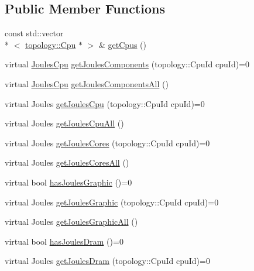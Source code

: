 \subsection*{Public Member Functions}
\begin{DoxyCompactItemize}
\item 
const std\-::vector\\*
$<$ \hyperlink{classmammut_1_1topology_1_1Cpu}{topology\-::\-Cpu} $\ast$ $>$ \& \hyperlink{classmammut_1_1energy_1_1CounterCpus_a25dbf6940e615a3662cbe10292ad7eaa}{get\-Cpus} ()
\item 
virtual \hyperlink{classmammut_1_1energy_1_1JoulesCpu}{Joules\-Cpu} \hyperlink{classmammut_1_1energy_1_1CounterCpus_a4324fc4985dc89228450436db46551b7}{get\-Joules\-Components} (topology\-::\-Cpu\-Id cpu\-Id)=0
\item 
virtual \hyperlink{classmammut_1_1energy_1_1JoulesCpu}{Joules\-Cpu} \hyperlink{classmammut_1_1energy_1_1CounterCpus_ad6a20ef6baa36b01f55b2065e01ec3f8}{get\-Joules\-Components\-All} ()
\item 
virtual Joules \hyperlink{classmammut_1_1energy_1_1CounterCpus_a80c1f90abccce3f3ab621f08f7141f78}{get\-Joules\-Cpu} (topology\-::\-Cpu\-Id cpu\-Id)=0
\item 
virtual Joules \hyperlink{classmammut_1_1energy_1_1CounterCpus_aa50b03617eafb90d64460941a8641a28}{get\-Joules\-Cpu\-All} ()
\item 
virtual Joules \hyperlink{classmammut_1_1energy_1_1CounterCpus_a2c041bbe181f593a50490a53a2729989}{get\-Joules\-Cores} (topology\-::\-Cpu\-Id cpu\-Id)=0
\item 
virtual Joules \hyperlink{classmammut_1_1energy_1_1CounterCpus_a615edc6a1ece84d27ca1a508ec1a72d8}{get\-Joules\-Cores\-All} ()
\item 
virtual bool \hyperlink{classmammut_1_1energy_1_1CounterCpus_a94de30741049ba2131bcac532b8e7c8e}{has\-Joules\-Graphic} ()=0
\item 
virtual Joules \hyperlink{classmammut_1_1energy_1_1CounterCpus_a436f91199f40af85ce1b561781f24459}{get\-Joules\-Graphic} (topology\-::\-Cpu\-Id cpu\-Id)=0
\item 
virtual Joules \hyperlink{classmammut_1_1energy_1_1CounterCpus_a197fb5668718742b559a2c0905395359}{get\-Joules\-Graphic\-All} ()
\item 
virtual bool \hyperlink{classmammut_1_1energy_1_1CounterCpus_a3d8c64aac5808275abdb2b01a31cbc11}{has\-Joules\-Dram} ()=0
\item 
virtual Joules \hyperlink{classmammut_1_1energy_1_1CounterCpus_a832e466d0a1f40f347d9a0211059a762}{get\-Joules\-Dram} (topology\-::\-Cpu\-Id cpu\-Id)=0

\end{DoxyCompactItemize}
